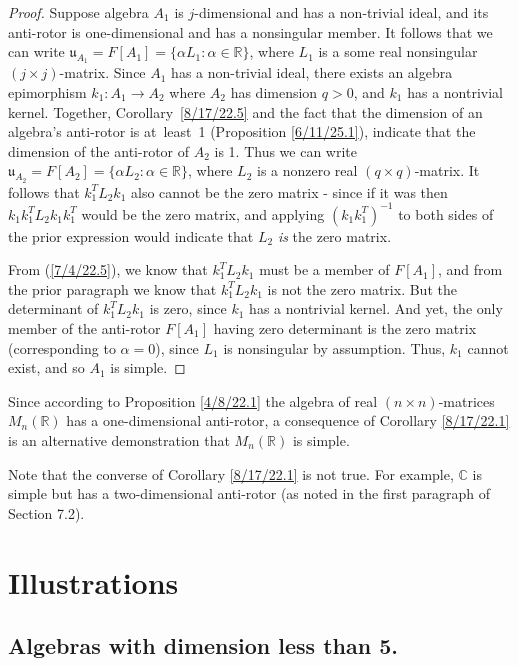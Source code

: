 \documentclass{amsart}
\theoremstyle{definition}
\numberwithin{theorem}{section}
\numberwithin{equation}{section}
\begin{document}
\begin{proof} Suppose algebra $A_1$ is $j$-dimensional and has a non-trivial ideal, and its anti-rotor is one-dimensional and has a nonsingular member.  It follows that we can write $\mathfrak{u}_{A_1} = F[A_1] = \{\alpha L_1:\alpha\in \mathbb{R}\}$, where $L_1$ is a some real nonsingular $(j\times j)$-matrix.  Since $A_1$ has a non-trivial ideal, there exists an algebra epimorphism $k_1:A_1\rightarrow A_2$ where $A_2$ has dimension $q>0$, and $k_1$ has a nontrivial kernel.  Together, \mbox{Corollary \ref{8/17/22.5}} and the fact that the dimension of an algebra's anti-rotor is \mbox{at least 1} (Proposition \ref{6/11/25.1}), indicate that the dimension of the anti-rotor of $A_2$ is 1.   Thus we can write $\mathfrak{u}_{A_2} = F[A_2] = \{\alpha L_2:\alpha\in \mathbb{R}\}$, where $L_2$ is a nonzero real $(q\times q)$-matrix.  It follows that $k_1^T L_2 k_1$ also cannot be the zero matrix - since if it was then $k_1k_1^T L_2 k_1k_1^T$ would be the zero matrix, and applying $(k_1k_1^T)^{-1}$ to both sides of the prior expression would indicate that $L_2$ {\it is} the zero matrix.  

From (\ref{7/4/22.5}), we know that $ k_1^T L_2 k_1$ must be a member of $F[A_1]$, and from the prior paragraph we know that $ k_1^T L_2 k_1$ is not the zero matrix.  But the determinant of $k_1^T L_2 k_1$ is zero, since $k_1$ has a  nontrivial kernel.  And yet, the only member of the anti-rotor $F[A_1]$ having zero determinant is the zero matrix (corresponding to $\alpha=0$), since $L_1$ is nonsingular by assumption.   Thus, $k_1$ cannot exist, and so $A_1$ is simple. \end{proof}

Since according to Proposition \ref{4/8/22.1} the algebra of real $(n\times n)$-matrices $M_n(\mathbb{R})$ has a one-dimensional anti-rotor, a consequence of Corollary \ref{8/17/22.1} is an alternative demonstration that $M_n(\mathbb{R})$ is simple.  

Note that the converse of Corollary \ref{8/17/22.1} is not true.  For example, $\mathbb{C}$ is simple but has a two-dimensional anti-rotor (as noted in the first paragraph of Section 7.2). 
  
 
     
     \section{Illustrations} \subsection{Algebras with dimension less than 5.}
     
\end{document}
